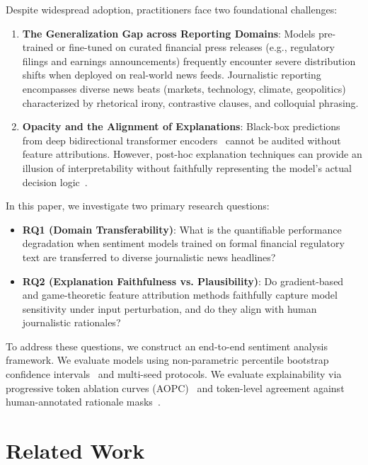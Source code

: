 \documentclass[10pt,twocolumn,letterpaper]{article}
\begin{document}
Despite widespread adoption, practitioners face two foundational challenges:
\begin{enumerate}
    \item \textbf{The Generalization Gap across Reporting Domains}: Models pre-trained or fine-tuned on curated financial press releases (e.g., regulatory filings and earnings announcements) frequently encounter severe distribution shifts when deployed on real-world news feeds. Journalistic reporting encompasses diverse news beats (markets, technology, climate, geopolitics) characterized by rhetorical irony, contrastive clauses, and colloquial phrasing.
    \item \textbf{Opacity and the Alignment of Explanations}: Black-box predictions from deep bidirectional transformer encoders~\cite{liu2019roberta} cannot be audited without feature attributions. However, post-hoc explanation techniques can provide an illusion of interpretability without faithfully representing the model's actual decision logic~\cite{samek2017evaluating}.
\end{enumerate}

In this paper, we investigate two primary research questions:
\begin{itemize}
    \item \textbf{RQ1 (Domain Transferability)}: What is the quantifiable performance degradation when sentiment models trained on formal financial regulatory text are transferred to diverse journalistic news headlines?
    \item \textbf{RQ2 (Explanation Faithfulness vs. Plausibility)}: Do gradient-based and game-theoretic feature attribution methods faithfully capture model sensitivity under input perturbation, and do they align with human journalistic rationales?
\end{itemize}

To address these questions, we construct an end-to-end sentiment analysis framework. We evaluate models using non-parametric percentile bootstrap confidence intervals~\cite{efron1993bootstrap} and multi-seed protocols. We evaluate explainability via progressive token ablation curves (AOPC)~\cite{samek2017evaluating,petsiuk2018rise} and token-level agreement against human-annotated rationale masks~\cite{deyoung2020eraser}.

\section{Related Work}
\end{document}
